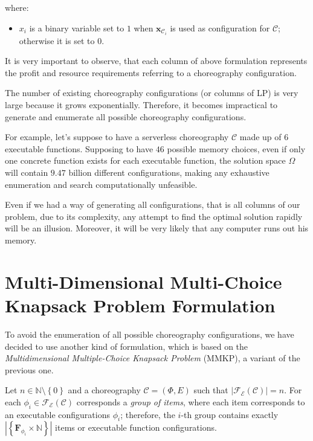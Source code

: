 \documentclass[12pt,a4paper]{report}
\newcommand{\N}{\mathbb{N}}
\begin{document}
where:

\begin{itemize}
	\item $x_i$ is a binary variable set to $1$ when  $\textbf{x}_{\mathcal{C}_i}$ is used as configuration for $\mathcal{C}$; otherwise it is set to $0$.
\end{itemize}

It is very important to observe, that each column of above formulation represents the profit and resource requirements referring to a choreography configuration.

The number of existing choreography configurations (or columns of LP) is very large because it grows exponentially. Therefore, it becomes impractical to generate and enumerate all possible choreography configurations.

For example, let's suppose to have a serverless choreography $\mathcal{C}$ made up of $6$ executable functions. Supposing to have $46$ possible memory choices, even if only one concrete function exists for each executable function, the solution space $\Omega$ will contain $9.47$ billion different configurations, making any exhaustive enumeration and search computationally unfeasible. 

Even if we had a way of generating all configurations, that is all columns of our problem, due to its complexity, any attempt to find the optimal solution rapidly will be an illusion. Moreover, it will be very likely that any computer runs out his memory.

\section{Multi-Dimensional Multi-Choice Knapsack Problem Formulation}

To avoid the enumeration of all possible choreography configurations, we have decided to use another kind of formulation, which is based on the \textit{Multidimensional Multiple-Choice Knapsack Problem} (MMKP), a variant of the previous one. 

Let $n \in \N \setminus \left\{0\right\}$ and a choreography $\mathcal{C} = (\Phi,E)$ such that $|\mathscr{F_E}(\mathcal{C})| = n$. For each $\phi_i \in \mathscr{F_E}(\mathcal{C})$ corresponds a \textit{group of items}, where each item corresponds to an executable configurations $\phi_i$; therefore, the $i$-th group contains exactly $|\left\{ \textbf{F}_{\phi_{i}} \times \N \right\}|$ items or executable function configurations.
\end{document}

